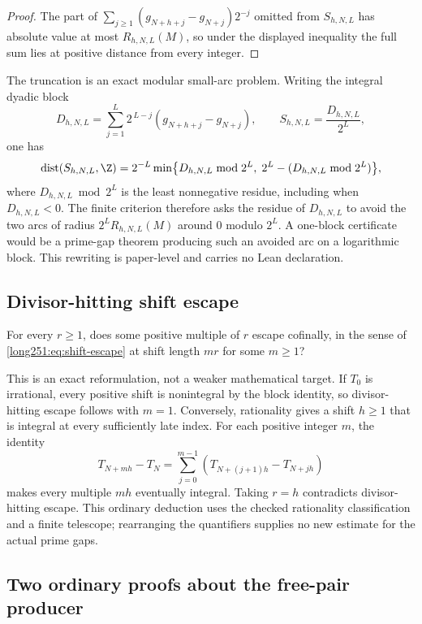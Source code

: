 \documentclass[11pt]{article}
\begin{document}
\begin{proof}
The part of $\sum_{j\ge1}(g_{N+h+j}-g_{N+j})2^{-j}$ omitted from $S_{h,N,L}$
has absolute value at most $R_{h,N,L}(M)$, so under the displayed inequality
the full sum lies at positive distance from every integer.
\end{proof}

The truncation is an exact modular small-arc problem.  Writing the integral
dyadic block
\[
 D_{h,N,L}=\sum_{j=1}^{L}2^{\,L-j}(g_{N+h+j}-g_{N+j}),
 \qquad S_{h,N,L}=\frac{D_{h,N,L}}{2^{L}},
\]
one has
\[
 \operatorname{dist}(S_{h,N,L},\Z)
 =2^{-L}\min\bigl\{D_{h,N,L}\bmod2^{L},\;
 2^{L}-(D_{h,N,L}\bmod2^{L})\bigr\},
\]
where $D_{h,N,L}\bmod2^{L}$ is the least nonnegative residue, including when
$D_{h,N,L}<0$.  The finite criterion therefore asks the residue of
$D_{h,N,L}$ to avoid the two arcs of radius $2^{L}R_{h,N,L}(M)$ around $0$
modulo $2^{L}$.  A one-block certificate would be a prime-gap theorem
producing such an avoided arc on a logarithmic block.  This rewriting is
paper-level and carries no Lean declaration.

\subsection{Divisor-hitting shift escape}\label{long251:sec:xr-divisorhit}

\begin{problem}\label{long251:xr:divisor-hit}
For every $r\ge1$, does some positive multiple of $r$ escape cofinally, in the
sense of \eqref{long251:eq:shift-escape} at shift length $mr$ for some $m\ge1$?
\end{problem}

This is an exact reformulation, not a weaker mathematical target.
If $T_0$ is irrational, every positive shift is nonintegral by the block
identity, so divisor-hitting escape follows with $m=1$.  Conversely,
rationality gives a shift $h\ge1$ that is integral at every sufficiently
late index.  For each positive integer $m$, the identity
\[
 T_{N+mh}-T_N=\sum_{j=0}^{m-1}(T_{N+(j+1)h}-T_{N+jh})
\]
makes every multiple $mh$ eventually integral.  Taking $r=h$ contradicts
divisor-hitting escape.  This ordinary deduction uses the checked
rationality classification and a finite telescope; rearranging the
quantifiers supplies no new estimate for the actual prime gaps.

\subsection{Two ordinary proofs about the free-pair producer}
\label{long251:sec:xr-compression}
\end{document}
